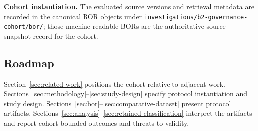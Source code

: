 \textbf{Cohort instantiation.} The evaluated source versions and retrieval metadata are recorded in the canonical BOR objects under \texttt{investigations/b2-governance-cohort/bor/}; those machine-readable BORs are the authoritative source snapshot record for the cohort.

\subsection{Roadmap}
Section~\ref{sec:related-work} positions the cohort relative to adjacent work. Sections~\ref{sec:methodology}--\ref{sec:study-design} specify protocol instantiation and study design. Sections~\ref{sec:bor}--\ref{sec:comparative-dataset} present protocol artifacts. Sections~\ref{sec:analysis}--\ref{sec:retained-classification} interpret the artifacts and report cohort-bounded outcomes and threats to validity.
